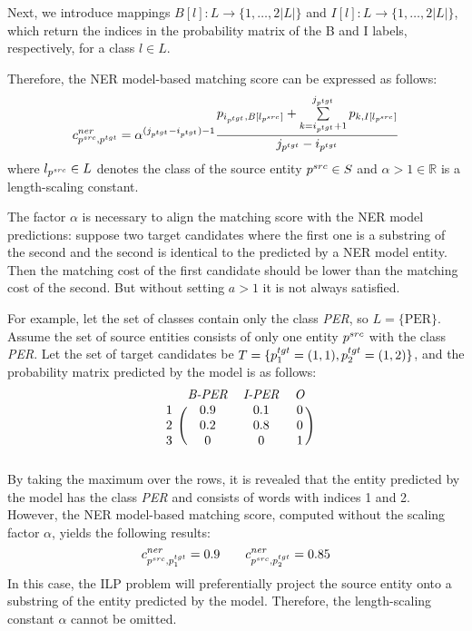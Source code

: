 Next, we introduce mappings \( B[l]: L \rightarrow \{ 1, \dots, 2|L| \} \) and
\( I[l]: L \rightarrow \{ 1, \dots, 2|L| \} \), which return the indices in the probability matrix
of the B and I labels, respectively, for a class \( l \in L \).

Therefore, the NER model-based matching score can be expressed as follows:
\begin{equation} \label{eq:ner_cost}
  c_{p^{src}, p^{tgt}}^{ner} = \alpha^{(j_{p^{tgt}} - i_{p^{tgt}}) - 1}
  \frac{
    p_{i_{p^{tgt}}, B[l_{p^{src}}]} +
    \sum\limits_{k = i_{p^{tgt}} + 1}^{j_{p^{tgt}}} p_{k, I[l_{p^{src}}]}
  }
  {j_{p^{tgt}} - i_{p^{tgt}}}
\end{equation}
where \( l_{p^{src}} \in L \) denotes the class of the source entity
\( p^{src} \in S \) and \( \alpha > 1 \in \mathbb{R} \) is a length-scaling constant.

The factor \( \alpha \) is necessary to align the matching score with the NER model
predictions: suppose two target candidates where the first one is a substring of the second
and the second is identical to the predicted by a NER model entity. Then the matching cost
of the first candidate should be lower than the matching cost of the second. But without setting
\( a > 1 \) it is not always satisfied.

For example, let the set of classes contain only the class \textit{PER},
so \( L = \{ \text{PER} \} \). Assume the set of source entities consists of
only one entity \( p^{src} \) with the class \textit{PER}. Let the set of target
candidates be \( T = \{ p_1^{tgt} = (1, 1), p_2^{tgt} = (1, 2) \} \), and the
probability matrix predicted by the model is as follows:
\[
  \begin{blockarray}{cccc}
    & \text{\textit{B-PER}} & \text{\textit{I-PER}} & \text{\textit{O}} \\
    \begin{block}{c(ccc)}
      1 & 0.9 & 0.1 & 0 \\
      2 & 0.2 & 0.8 & 0 \\
      3 & 0   & 0   & 1 \\
    \end{block}
  \end{blockarray}
\]
By taking the maximum over the rows, it is revealed that the entity predicted by
the model has the class \textit{PER} and consists of words with indices 1 and 2.
However, the NER model-based matching score, computed without the scaling factor
\( \alpha \), yields the following results:
\[
  c_{p^{src}, p_1^{tgt}}^{ner} = 0.9 \qquad c_{p^{src}, p_2^{tgt}}^{ner} = 0.85
\]
In this case, the ILP problem will preferentially project the source entity onto a
substring of the entity predicted by the model. Therefore, the length-scaling
constant \( \alpha \) cannot be omitted.

